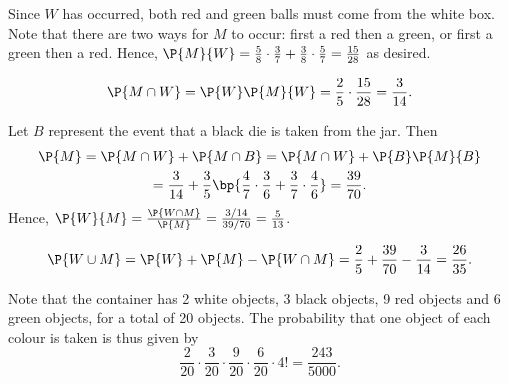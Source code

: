 \begin{solution}
    Since $W$ has occurred, both red and green balls must come from the white box. Note that there are two ways for $M$ to occur: first a red then a green, or first a green then a red. Hence, $\P{M}{W} = \frac58 \cdot \frac37 + \frac38 \cdot \frac57 = \frac{15}{28}$ as desired.

    \begin{ppart}
        \[\P{M \cap W} = \P{W} \P{M}{W} = \frac25 \cdot \frac{15}{28} = \frac{3}{14}.\]
    \end{ppart}
    \begin{ppart}
        Let $B$ represent the event that a black die is taken from the jar. Then 
        \begin{gather*}
            \P{M} = \P{M \cap W} + \P{M \cap B} = \P{M \cap W} + \P{B} \P{M}{B} \\
            = \frac{3}{14} + \frac35 \bp{\frac47\cdot\frac36 + \frac37\cdot\frac46} = \frac{39}{70}.
        \end{gather*}
        Hence, $\P{W}{M} = \frac{\P{W \cap M}}{\P{M}} = \frac{3/14}{39/70} = \frac5{13}$.
    \end{ppart}
    \begin{ppart}
        \[\P{W \cup M} = \P{W} + \P{M} - \P{W \cap M} = \frac25 + \frac{39}{70} - \frac{3}{14} = \frac{26}{35}.\]
    \end{ppart}

    Note that the container has 2 white objects, 3 black objects, 9 red objects and 6 green objects, for a total of 20 objects. The probability that one object of each colour is taken is thus given by \[\frac2{20} \cdot \frac{3}{20} \cdot \frac9{20} \cdot \frac6{20} \cdot 4! = \frac{243}{5000}.\]
\end{solution}

